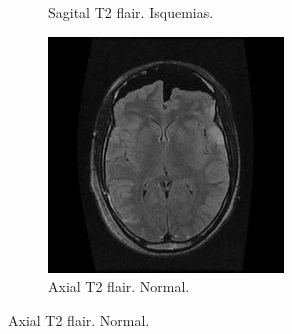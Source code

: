\begin{figure}[H]
\begin{subfigure}[b]{0.3\textwidth}
        \caption{Sagital T2 flair. Isquemias.}
        \label{fig:normal2}
    \end{subfigure}
    \hfill
    \begin{subfigure}[b]{0.3\textwidth}
        \centering
        \includegraphics[width=\linewidth]{chapters/deteccion/images/sano3.jpg}
        \caption{Axial T2 flair. Normal.}
        \label{fig:normal3}
    \end{subfigure}
    
    \vspace{0.5cm}
    

\end{figure}
